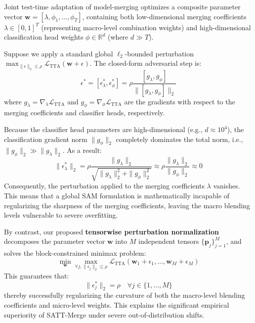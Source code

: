 \documentclass{article}
\begin{document}
Joint test-time adaptation of model-merging optimizes a composite parameter vector $\mathbf{w} = [\lambda, \phi_1, \dots, \phi_T]$, containing both low-dimensional merging coefficients $\lambda \in [0, 1]^T$ (representing macro-level combination weights) and high-dimensional classification head weights $\phi \in \mathbb{R}^d$ (where $d \gg T$).

Suppose we apply a standard global $\ell_2$-bounded perturbation $\max_{\|\epsilon\|_2 \le \rho} \mathcal{L}_{\text{TTA}}(\mathbf{w} + \epsilon)$. The closed-form adversarial step is:
\begin{equation}
\epsilon^* = [\epsilon^*_\lambda, \epsilon^*_\phi] = \rho \frac{[g_\lambda, g_\phi]}{\|[g_\lambda, g_\phi]\|_2}
\end{equation}
where $g_\lambda = \nabla_\lambda \mathcal{L}_{\text{TTA}}$ and $g_\phi = \nabla_\phi \mathcal{L}_{\text{TTA}}$ are the gradients with respect to the merging coefficients and classifier heads, respectively.

Because the classifier head parameters are high-dimensional (e.g., $d \approx 10^4$), the classification gradient norm $\|g_\phi\|_2$ completely dominates the total norm, i.e., $\|g_\phi\|_2 \gg \|g_\lambda\|_2$. As a result:
\begin{equation}
\|\epsilon^*_\lambda\|_2 = \rho \frac{\|g_\lambda\|_2}{\sqrt{\|g_\lambda\|_2^2 + \|g_\phi\|_2^2}} \approx \rho \frac{\|g_\lambda\|_2}{\|g_\phi\|_2} \approx 0
\end{equation}
Consequently, the perturbation applied to the merging coefficients $\lambda$ vanishes. This means that a global SAM formulation is mathematically incapable of regularizing the sharpness of the merging coefficients, leaving the macro blending levels vulnerable to severe overfitting.

By contrast, our proposed \textbf{tensorwise perturbation normalization} decomposes the parameter vector $\mathbf{w}$ into $M$ independent tensors $\{\mathbf{p}_j\}_{j=1}^M$, and solves the block-constrained minimax problem:
\begin{equation}
\min_{\mathbf{w}} \max_{\forall j, \|\epsilon_j\|_2 \le \rho} \mathcal{L}_{\text{TTA}}(\mathbf{w}_1 + \epsilon_1, \dots, \mathbf{w}_M + \epsilon_M)
\end{equation}
This guarantees that:
\begin{equation}
\|\epsilon^*_j\|_2 = \rho \quad \forall j \in \{1, \dots, M\}
\end{equation}
thereby successfully regularizing the curvature of both the macro-level blending coefficients and micro-level weights. This explains the significant empirical superiority of SATT-Merge under severe out-of-distribution shifts.
\end{document}
